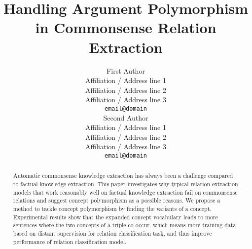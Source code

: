 \documentclass[11pt,a4paper]{article}
\title{Handling Argument Polymorphism in Commonsense Relation Extraction}
\author{First Author \\
  Affiliation / Address line 1 \\
  Affiliation / Address line 2 \\
  Affiliation / Address line 3 \\
  \texttt{email@domain} \\\And
  Second Author \\
  Affiliation / Address line 1 \\
  Affiliation / Address line 2 \\
  Affiliation / Address line 3 \\
  \texttt{email@domain} \\}
\date{}
\begin{document}
\maketitle
\begin{abstract}

Automatic commonsense knowledge extraction has always been a challenge compared to factual knowledge extraction. This paper investigates why typical relation extraction models that work reasonably well on factual knowledge extraction fail on commonsense relations and suggest concept polymorphism as a possible reasons. We propose a method to tackle concept polymorphism by finding the variants of a concept. Experimental results show that the expanded concept vocabulary leads to more sentences where the two concepts of a triple co-occur, which means more training data based on distant supervision for relation classification task, and thus improve performance of relation classification model.

\end{abstract}


















\end{document}
